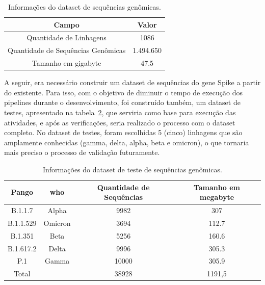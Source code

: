 \begin{table}[htb]
  \caption{Informações do dataset de sequências genômicas.}
  \begin{center}
    \begin{tabular}{c|c}
      \hline
      Campo                              & Valor     \\
      \hline
      Quantidade de Linhagens            & 1086      \\
      Quantidade de Sequências Genômicas & 1.494.650 \\
      Tamanho em \gls{gigabyte}          & 47.5      \\
      \hline
    \end{tabular}
  \end{center}
  \label{tab:datasetGenomas}
\end{table}

A seguir, era necessário construir um dataset de sequências do gene Spike a partir do existente. Para isso, com o objetivo de diminuir o tempo de execução dos pipelines durante o desenvolvimento, foi construído também, um dataset de testes, apresentado na tabela~\ref{tab:datasetGenomasTeste}, que serviria como base para execução das atividades, e após as verificações, seria realizado o processo com o dataset completo. No dataset de testes, foram escolhidas 5 (cinco) linhagens que são amplamente conhecidas (gamma, delta, alpha, beta e omicron), o que tornaria mais preciso o processo de validação futuramente.

\begin{table}[htb]
  \caption{Informações do dataset de teste de sequências genômicas.}
  \begin{center}
    \begin{tabular}{c|c|c|c}
      \hline
      Pango     & \gls{who} & Quantidade de Sequências & Tamanho em \gls{megabyte} \\
      \hline
      B.1.1.7   & Alpha     & 9982                     & 307                       \\
      B.1.1.529 & Omicron   & 3694                     & 112.7                     \\
      B.1.351   & Beta      & 5256                     & 160.6                     \\
      B.1.617.2 & Delta     & 9996                     & 305.3                     \\
      P.1       & Gamma     & 10000                    & 305.9                     \\
      \hline
      Total     &           & 38928                    & 1191,5                    \\
      \hline
    \end{tabular}
  \end{center}
  \label{tab:datasetGenomasTeste}
\end{table}


